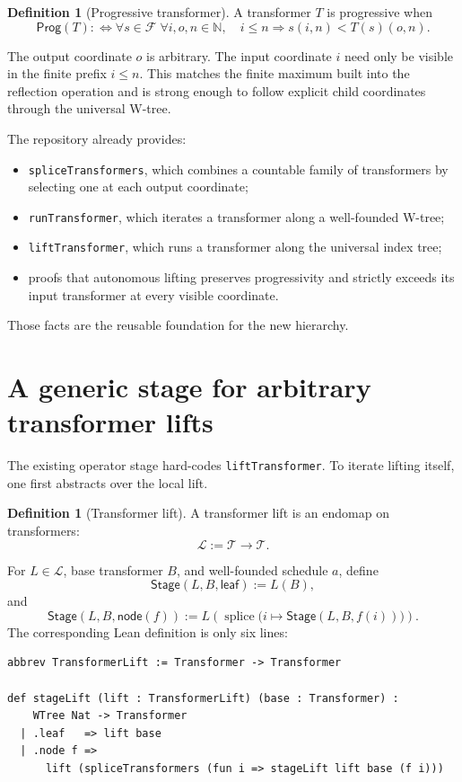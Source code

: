 \documentclass[11pt]{article}
\theoremstyle{definition}
\newtheorem{definition}[theorem]{Definition}
\newcommand{\Nat}{\mathbb{N}}
\newcommand{\Family}{\mathcal{F}}
\newcommand{\Trans}{\mathcal{T}}
\newcommand{\Lift}{\mathcal{L}}
\newcommand{\Prog}{\mathsf{Prog}}
\newcommand{\stage}{\mathsf{Stage}}
\newcommand{\code}[1]{\texttt{#1}}
\begin{document}
\begin{definition}[Progressive transformer]
A transformer $T$ is progressive when
\[
 \Prog(T) :\Longleftrightarrow
 \forall s\in\Family\;\forall i,o,n\in\Nat,
 \quad i\le n \Longrightarrow s(i,n)<T(s)(o,n).
\]
\end{definition}

The output coordinate $o$ is arbitrary.  The input coordinate $i$ need only be visible in the finite prefix $i\le n$.  This matches the finite maximum built into the reflection operation and is strong enough to follow explicit child coordinates through the universal W-tree.

The repository already provides:
\begin{itemize}
\item \code{spliceTransformers}, which combines a countable family of transformers by selecting one at each output coordinate;
\item \code{runTransformer}, which iterates a transformer along a well-founded W-tree;
\item \code{liftTransformer}, which runs a transformer along the universal index tree;
\item proofs that autonomous lifting preserves progressivity and strictly exceeds its input transformer at every visible coordinate.
\end{itemize}

Those facts are the reusable foundation for the new hierarchy.

\section{A generic stage for arbitrary transformer lifts}

The existing operator stage hard-codes \code{liftTransformer}.  To iterate lifting itself, one first abstracts over the local lift.

\begin{definition}[Transformer lift]
A transformer lift is an endomap on transformers:
\[
  \Lift := \Trans\to\Trans.
\]
\end{definition}

For $L\in\Lift$, base transformer $B$, and well-founded schedule $a$, define
\[
\stage(L,B,\mathsf{leaf}) := L(B),
\]
and
\[
\stage(L,B,\mathsf{node}(f))
 :=L\!\left(\operatorname{splice}
       \bigl(i\mapsto\stage(L,B,f(i))\bigr)\right).
\]
The corresponding Lean definition is only six lines:

\begin{lstlisting}[caption={Schematic ASCII rendering of \texttt{stageLift}.}]
abbrev TransformerLift := Transformer -> Transformer

def stageLift (lift : TransformerLift) (base : Transformer) :
    WTree Nat -> Transformer
  | .leaf   => lift base
  | .node f =>
      lift (spliceTransformers (fun i => stageLift lift base (f i)))
\end{lstlisting}
\end{document}
